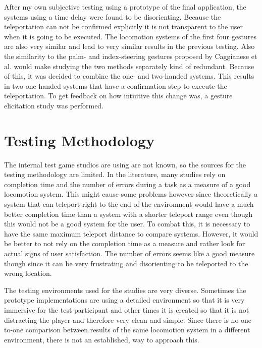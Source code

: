 After my own subjective testing using a prototype of the final application, the systems using a time delay were found to be disorienting. Because the teleportation can not be confirmed explicitly it is not transparent to the user when it is going to be executed. The locomotion systems of the first four gestures are also very similar and lead to very similar results in the previous testing. Also the similarity to the palm- and index-steering gestures proposed by Caggianese et al. would make studying the two methods separately kind of redundant. Because of this, it was decided to combine the one- and two-handed systems. This results in two one-handed systems that have a confirmation step to execute the teleportation. To get feedback on how intuitive this change was, a gesture elicitation study was performed. 

\section{Testing Methodology}
The internal test game studios are using are not known, so the sources for the testing methodology are limited. In the literature, many studies rely on completion time and the number of errors during a task as a measure of a good locomotion system. %
This might cause some problems however since theoretically a system that can teleport right to the end of the environment would have a much better completion time than a system with a shorter teleport range even though this would not be a good system for the user. To combat this, it is necessary to have the same maximum teleport distance to compare systems. However, it would be better to not rely on the completion time as a measure and rather look for actual signs of user satisfaction. The number of errors seems like a good measure though since it can be very frustrating and disorienting to be teleported to the wrong location. 

The testing environments used for the studies are very diverse. Sometimes the prototype implementations are using a detailed environment so that it is very immersive for the test participant and other times it is created so that it is not distracting the player and therefore very clean and simple. %
Since there is no one-to-one comparison between results of the same locomotion system in a different environment, there is not an established, way to approach this.

